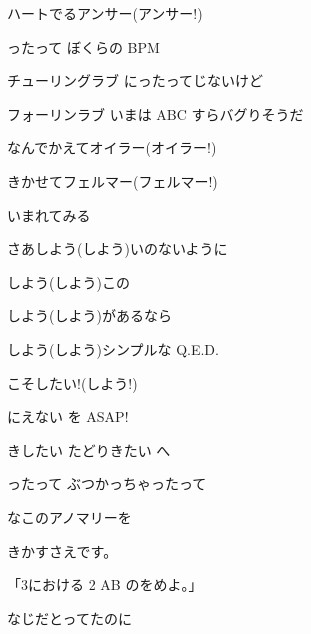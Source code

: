 \documentclass[a4paper,tate,twocolumn,12pt]{ltjtarticle}
\begin{document}
\begin{flushleft}
\begin{minipage}{\linewidth}
ハートでるアンサー(アンサー!)

ったって ぼくらの BPM

チューリングラブ にったってじないけど

フォーリンラブ いまは ABC すらバグりそうだ

なんでかえてオイラー(オイラー!)

きかせてフェルマー(フェルマー!)

 いまれてみる
\end{minipage}

\vspace{2em}

\noindent\begin{minipage}{\linewidth}
さあしよう(しよう)いのないように

しよう(しよう)この

しよう(しよう)があるなら

しよう(しよう)シンプルな Q.E.D.

こそしたい!(しよう!)

にえない を ASAP!

きしたい たどりきたい へ

ったって ぶつかっちゃったって

なこのアノマリーを

きかすさえです。
\end{minipage}

\vspace{2em}

\noindent\begin{minipage}{\linewidth}
「3における 2 AB のをめよ。」

なじだとってたのに


\end{minipage}
\end{flushleft}
\end{document}
